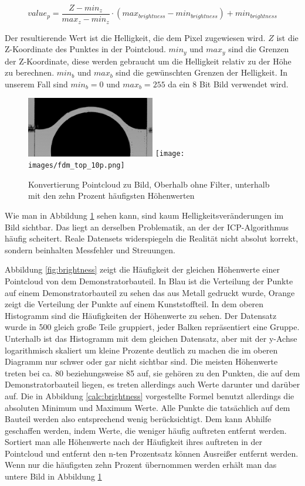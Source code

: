 \begin{equation*}\label{calc:brightness}
    value_p = \frac{Z - min_z}{max_z - min_z} \cdot (max_{brightness} - min_{brightness}) + min_{brightness}
\end{equation*}

Der resultierende Wert ist die Helligkeit, die dem Pixel zugewiesen wird.
$Z$ ist die Z-Koordinate des Punktes in der Pointcloud. $min_y$ und $max_y$ sind 
die Grenzen der Z-Koordinate, diese werden gebraucht um die Helligkeit relativ 
zu der Höhe zu berechnen. $min_b$ und $max_b$ sind die gewünschten Grenzen der 
Helligkeit. In unserem Fall sind $min_b = 0$ und $max_b = 255$ da ein 8 Bit Bild
verwendet wird.

\begin{figure}[h]
    \centering
    \includegraphics[width=0.5\textwidth]{images/fdm_top_100p.png}
    \texttt{[image: images/fdm\_top\_10p.png]}
    \caption{Konvertierung Pointcloud zu Bild, Oberhalb ohne Filter, unterhalb 
    mit den zehn Prozent häufigsten Höhenwerten}
    \label{fig:image_from_pc}
\end{figure}

Wie man in Abbildung \ref{fig:image_from_pc} sehen kann, sind kaum Helligkeitsveränderungen
im Bild sichtbar. Das liegt an derselben Problematik, an der der ICP-Algorithmus häufig
scheitert. Reale Datensets widerspiegeln die Realität nicht absolut korrekt, sondern
beinhalten Messfehler und Streuungen.

Abbildung \ref*{fig:brightness} zeigt die Häufigkeit der gleichen Höhenwerte einer
Pointcloud von dem Demonstratorbauteil. In Blau ist die Verteilung der Punkte auf 
einem Demonstratorbauteil zu sehen das aus Metall gedruckt wurde, Orange zeigt die 
Verteilung der Punkte auf einem Kunststoffteil.
In dem oberen Histogramm 
sind die Häufigkeiten der Höhenwerte zu sehen. Der Datensatz wurde in 500 gleich große
Teile gruppiert, jeder Balken repräsentiert eine Gruppe.
Unterhalb ist das Histogramm mit dem gleichen Datensatz, aber mit der y-Achse 
logarithmisch skaliert um kleine Prozente deutlich zu machen die im
oberen Diagramm nur schwer oder gar nicht sichtbar sind. 
Die meisten Höhenwerte treten bei ca. 80 beziehungsweise 85 auf, 
sie gehören zu den Punkten, die auf dem Demonstratorbauteil liegen, 
es treten allerdings auch Werte darunter und darüber auf. 
Die in Abbildung \ref*{calc:brightness} vorgestellte Formel benutzt allerdings 
die absoluten Minimum und Maximum Werte.
Alle Punkte die tatsächlich auf dem Bauteil werden also entsprechend wenig
berücksichtigt. Dem kann Abhilfe geschaffen werden, indem Werte, die weniger häufig 
auftreten entfernt werden. Sortiert man alle Höhenwerte nach der Häufigkeit ihres 
auftreten in der Pointcloud und entfernt den n-ten Prozentsatz können Ausreißer 
entfernt werden. Wenn nur die häufigsten zehn Prozent übernommen werden erhält man 
das untere Bild in Abbildung \ref{fig:image_from_pc}

